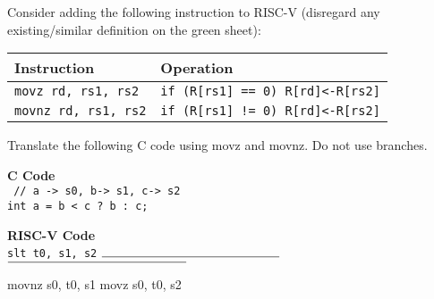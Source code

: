 \begin{blocksection}
Consider adding the following instruction to RISC-V 
(disregard any existing/similar definition on the green sheet):

\begin{tabular}{ |l|l| } 
 \hline
 \textbf{Instruction} & \textbf{Operation} \\ 
 \hline
 \texttt{movz rd, rs1, rs2} & \texttt{if (R[rs1] == 0) R[rd]<-R[rs2]}  \\ 
 \hline
 \texttt{movnz rd, rs1, rs2} & \texttt{if (R[rs1] != 0) R[rd]<-R[rs2]} \\ 
 \hline
\end{tabular}


\question
Translate the following C code using movz and movnz. Do not use branches.

\textbf{C Code} \\
\texttt{
// a -> s0, b-> s1, c-> s2 \\
int a = b < c ? b : c;
}
\newline
\newline

\textbf{RISC-V Code} \\
\texttt{slt t0, s1, s2}
\newline
\newline
$\rule{5cm}{0.15mm}$
\newline
\newline
$\rule{5cm}{0.15mm}$

    
\begin{solution}[0.5in]
 movnz s0, t0, s1
 movz s0, t0, s2
\end{solution}

\end{blocksection}